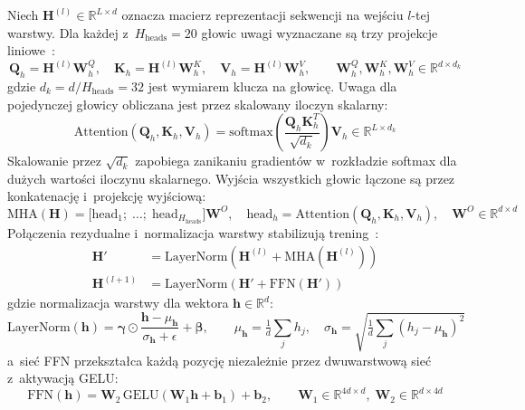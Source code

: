 \documentclass{SGGW-thesis}
\begin{document}
Niech $\mathbf{H}^{(l)} \in \mathbb{R}^{L \times d}$ oznacza macierz reprezentacji sekwencji
na wejściu $l$-tej warstwy. Dla każdej z~$H_{\text{heads}} = 20$ głowic uwagi wyznaczane są
trzy projekcje liniowe~\cite{vaswani2017}:
\begin{equation}
    \mathbf{Q}_h = \mathbf{H}^{(l)}\mathbf{W}_h^Q,\quad
    \mathbf{K}_h = \mathbf{H}^{(l)}\mathbf{W}_h^K,\quad
    \mathbf{V}_h = \mathbf{H}^{(l)}\mathbf{W}_h^V,
    \qquad \mathbf{W}_h^Q,\mathbf{W}_h^K,\mathbf{W}_h^V \in \mathbb{R}^{d \times d_k}
    \label{eq:qkv}
\end{equation}
gdzie $d_k = d / H_{\text{heads}} = 32$ jest wymiarem klucza na głowicę. Uwaga dla pojedynczej
głowicy obliczana jest przez skalowany iloczyn skalarny:
\begin{equation}
    \mathrm{Attention}(\mathbf{Q}_h, \mathbf{K}_h, \mathbf{V}_h)
    = \mathrm{softmax}\!\left(\frac{\mathbf{Q}_h \mathbf{K}_h^T}{\sqrt{d_k}}\right)\mathbf{V}_h
    \in \mathbb{R}^{L \times d_k}
    \label{eq:attention}
\end{equation}
Skalowanie przez $\sqrt{d_k}$ zapobiega zanikaniu gradientów w~rozkładzie softmax dla dużych
wartości iloczynu skalarnego. Wyjścia wszystkich głowic łączone są przez konkatenację
i~projekcję wyjściową:
\begin{equation}
    \mathrm{MHA}(\mathbf{H}) = \bigl[\mathrm{head}_1;\; \ldots;\; \mathrm{head}_{H_{\text{heads}}}\bigr]\mathbf{W}^O,
    \quad \mathrm{head}_h = \mathrm{Attention}(\mathbf{Q}_h, \mathbf{K}_h, \mathbf{V}_h),
    \quad \mathbf{W}^O \in \mathbb{R}^{d \times d}
    \label{eq:mha}
\end{equation}
Połączenia rezydualne i~normalizacja warstwy stabilizują trening~\cite{ba2016,vaswani2017}:
\begin{align}
    \mathbf{H}' &= \mathrm{LayerNorm}\!\left(\mathbf{H}^{(l)} + \mathrm{MHA}(\mathbf{H}^{(l)})\right)
    \label{eq:residual1} \\
    \mathbf{H}^{(l+1)} &= \mathrm{LayerNorm}\!\left(\mathbf{H}' + \mathrm{FFN}(\mathbf{H}')\right)
    \label{eq:residual2}
\end{align}
gdzie normalizacja warstwy dla wektora $\mathbf{h} \in \mathbb{R}^d$:
\begin{equation}
    \mathrm{LayerNorm}(\mathbf{h}) = \boldsymbol{\gamma} \odot
    \frac{\mathbf{h} - \mu_{\mathbf{h}}}{\sigma_{\mathbf{h}} + \epsilon} + \boldsymbol{\beta},
    \qquad \mu_{\mathbf{h}} = \tfrac{1}{d}\sum_j h_j,\quad
    \sigma_{\mathbf{h}} = \sqrt{\tfrac{1}{d}\sum_j (h_j - \mu_{\mathbf{h}})^2}
    \label{eq:layernorm}
\end{equation}
a~sieć FFN przekształca każdą pozycję niezależnie przez dwuwarstwową sieć z~aktywacją GELU:
\begin{equation}
    \mathrm{FFN}(\mathbf{h}) = \mathbf{W}_2\,\mathrm{GELU}(\mathbf{W}_1 \mathbf{h} + \mathbf{b}_1) + \mathbf{b}_2,
    \qquad \mathbf{W}_1 \in \mathbb{R}^{4d \times d},\; \mathbf{W}_2 \in \mathbb{R}^{d \times 4d}
    \label{eq:ffn}
\end{equation}
\end{document}
